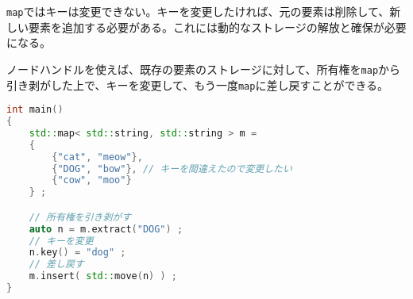 %
\noindent
{}

\lstinline!map!ではキーは変更できない。キーを変更したければ、元の要素は削除して、新しい要素を追加する必要がある。これには動的なストレージの解放と確保が必要になる。

ノードハンドルを使えば、既存の要素のストレージに対して、所有権を\lstinline!map!から引き剥がした上で、キーを変更して、もう一度\lstinline!map!に差し戻すことができる。

\begin{lstlisting}[language=C++]
int main()
{
    std::map< std::string, std::string > m =
    {
        {"cat", "meow"},
        {"DOG", "bow"}, // キーを間違えたので変更したい
        {"cow", "moo"}
    } ;

    // 所有権を引き剥がす
    auto n = m.extract("DOG") ;
    // キーを変更
    n.key() = "dog" ;
    // 差し戻す
    m.insert( std::move(n) ) ;
}
\end{lstlisting}

